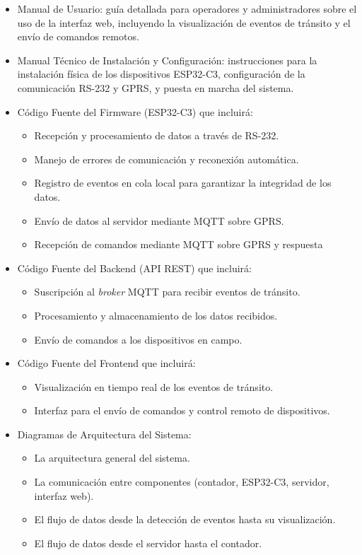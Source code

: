\documentclass[
11pt, %
]{charter}
\begin{document}
\begin{itemize}
	\item Manual de Usuario: guía detallada para operadores y administradores sobre el uso de la interfaz web, incluyendo la visualización de eventos de tránsito y el envío de comandos remotos.
	\item Manual Técnico de Instalación y Configuración: instrucciones para la instalación física de los dispositivos ESP32-C3, configuración de la comunicación RS-232 y GPRS, y puesta en marcha del sistema.
	\item Código Fuente del Firmware (ESP32-C3) que incluirá:
	\begin{itemize}
	\item Recepción y procesamiento de datos a través de RS-232.
	\item Manejo de errores de comunicación y reconexión automática.
	\item Registro de eventos en cola local para garantizar la integridad de los datos.
	\item Envío de datos al servidor mediante MQTT sobre GPRS.
	\item Recepción de comandos mediante MQTT sobre GPRS y respuesta
	\end{itemize}

\item Código Fuente del Backend (API REST) que incluirá:

\begin{itemize}
\item Suscripción al \textit{broker} MQTT para recibir eventos de tránsito.
\item Procesamiento y almacenamiento de los datos recibidos.
\item Envío de comandos a los dispositivos en campo. 
\end{itemize}

\item Código Fuente del Frontend que incluirá:
\begin{itemize}
\item Visualización en tiempo real de los eventos de tránsito.
\item Interfaz para el envío de comandos y control remoto de dispositivos.
\end{itemize}

\item Diagramas de Arquitectura del Sistema:
\begin{itemize}
\item La arquitectura general del sistema.
\item La comunicación entre componentes (contador, ESP32-C3, servidor, interfaz web).
\item El flujo de datos desde la detección de eventos hasta su visualización.
\item El flujo de datos desde el servidor hasta el contador.
\end{itemize}


\end{itemize}
\end{document}
